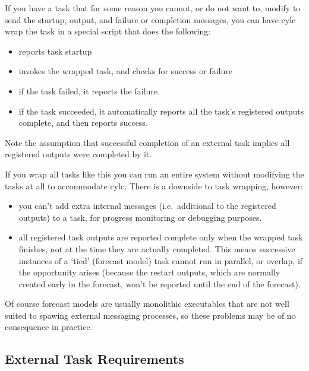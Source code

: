 \documentclass[11pt,a4paper]{article}
\begin{document}
If you have a task that for some reason you cannot, or do not want to,
modify to send the startup, output, and failure or completion messages, 
you can have cylc wrap the task in a special script that does the following:

\begin{itemize}
    \item reports task startup
    \item invokes the wrapped task, and checks for success or failure
    \item if the task failed, it reports the failure. 
    \item if the task succeeded, it automatically reports all the task's
        registered outputs complete, and then reports success.
\end{itemize}

Note the assumption that successful completion of an external task
implies all registered outputs were completed by it.

If you wrap all tasks like this you can run an entire system without
modifying the tasks at all to accommodate cylc. There is a downside to
task wrapping, however:

\begin{itemize}
    \item you can't add extra internal messages (i.e.\ additional to the
        registered outputs) to a task, for progress monitoring or
        debugging purposes.
    \item all registered task outputs are reported complete only
        when the wrapped task finishes, not at the time they are actually
        completed. This means successive instances of a `tied' (forecast
        model) task cannot run in parallel, or overlap, if the
        opportunity arises (because the restart outputs, which are
        normally created early in the forecast, won't be reported until
        the end of the forecast).
\end{itemize} 

Of course forecast models are usually monolithic executables that are not
well suited to spawing external messaging processes, so these problems
may be of no consequence in practice.

\pagebreak

\subsection{External Task Requirements} 
\label{ExternalTaskRequirements}
\end{document}
